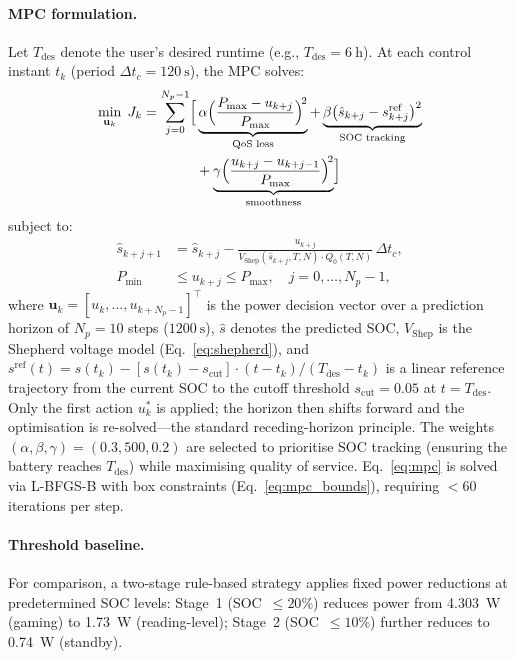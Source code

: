 \documentclass[5p,times,number]{elsarticle}
\newcommand{\eqnref}[1]{\textcolor{supercolor}{Eq.~\eqref{#1}}}
\newcommand{\eqnrefp}[1]{\textcolor{supercolor}{Eq.~\ref{#1}}}
\begin{document}
\paragraph{MPC formulation.}
Let $T_{\mathrm{des}}$ denote the user's desired runtime (e.g., $T_{\mathrm{des}} = \SI{6}{\hour}$).
At each control instant $t_k$ (period $\Delta t_c = \SI{120}{\second}$), the MPC solves:
\begin{equation}\label{eq:mpc}
\begin{aligned}
\min_{\mathbf{u}_k} \; J_k = \sum_{j=0}^{N_p - 1} \Bigl[
& \underbrace{\alpha \Bigl(\frac{P_{\max} - u_{k+j}}{P_{\max}}\Bigr)^{\!2}}_{\text{QoS loss}}
+ \underbrace{\beta \bigl(\hat{s}_{k+j} - s_{k+j}^{\mathrm{ref}}\bigr)^{2}}_{\text{SOC tracking}} \\
& + \underbrace{\gamma \Bigl(\frac{u_{k+j} - u_{k+j-1}}{P_{\max}}\Bigr)^{\!2}}_{\text{smoothness}}
\Bigr]
\end{aligned}
\end{equation}
subject to:
\begin{align}
\hat{s}_{k+j+1} &= \hat{s}_{k+j} - \frac{u_{k+j}}{V_{\mathrm{Shep}}(\hat{s}_{k+j}, T, N) \cdot Q_0(T,N)} \,\Delta t_c, \label{eq:mpc_dyn} \\
P_{\min} &\le u_{k+j} \le P_{\max}, \quad j = 0,\ldots,N_p{-}1, \label{eq:mpc_bounds}
\end{align}
where $\mathbf{u}_k = [u_k,\ldots,u_{k+N_p-1}]^\top$ is the power decision vector over a prediction horizon of $N_p = 10$ steps ($\SI{1200}{\second}$), $\hat{s}$ denotes the predicted SOC, $V_{\mathrm{Shep}}$ is the Shepherd voltage model (\eqnrefp{eq:shepherd}), and $s^{\mathrm{ref}}(t) = s(t_k) - [s(t_k) - s_{\mathrm{cut}}] \cdot (t - t_k)/(T_{\mathrm{des}} - t_k)$ is a linear reference trajectory from the current SOC to the cutoff threshold $s_{\mathrm{cut}} = 0.05$ at $t = T_{\mathrm{des}}$.
Only the first action $u_k^*$ is applied; the horizon then shifts forward and the optimisation is re-solved---the standard receding-horizon principle.
The weights $(\alpha, \beta, \gamma) = (0.3, 500, 0.2)$ are selected to prioritise SOC tracking (ensuring the battery reaches $T_{\mathrm{des}}$) while maximising quality of service.
\eqnref{eq:mpc} is solved via L-BFGS-B with box constraints (\eqnrefp{eq:mpc_bounds}), requiring $< 60$ iterations per step.

\paragraph{Threshold baseline.}
For comparison, a two-stage rule-based strategy applies fixed power reductions at predetermined SOC levels: Stage~1 (SOC~$\le 20\%$) reduces power from \SI{4.303}{\watt} (gaming) to \SI{1.73}{\watt} (reading-level); Stage~2 (SOC~$\le 10\%$) further reduces to \SI{0.74}{\watt} (standby).
\end{document}
